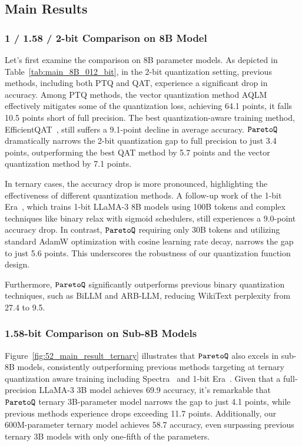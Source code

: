  


\subsection{Main Results}
\subsubsection{1 / 1.58 / 2-bit Comparison on 8B Model}
\label{sec:exp_8b}
Let's first examine the comparison on 8B parameter models. As depicted in Table~\ref{tab:main_8B_012_bit}, in the 2-bit quantization setting, previous methods, including both PTQ and QAT, experience a significant drop in accuracy. Among PTQ methods, the vector quantization method AQLM~\cite{egiazarian2024aqlm} effectively mitigates some of the quantization loss, achieving 64.1 points, it falls 10.5 points short of full precision. The best quantization-aware training method, EfficientQAT~\cite{chen2024efficientqat}, still suffers a 9.1-point decline in average accuracy.  $\texttt{ParetoQ}$ dramatically narrows the 2-bit quantization gap to full precision to just 3.4 points, outperforming the best QAT method by 5.7 points and the vector quantization method by 7.1 points.

In ternary cases, the accuracy drop is more pronounced, highlighting the effectiveness of different quantization methods. A follow-up work of the 1-bit Era~\cite{llama8B_1.58bit}, which trains 1-bit LLaMA-3 8B models using 100B tokens and complex techniques like binary relax with sigmoid schedulers, still experiences a 9.0-point accuracy drop. In contrast, $\texttt{ParetoQ}$ requiring only 30B tokens and utilizing standard AdamW optimization with cosine learning rate decay, narrows the gap to just 5.6 points. This underscores the robustness of our quantization function design. 

Furthermore, $\texttt{ParetoQ}$ significantly outperforms previous binary quantization techniques, such as BiLLM and ARB-LLM, reducing WikiText perplexity from 27.4 to 9.5.

\subsubsection{1.58-bit Comparison on Sub-8B Models}
\label{sec:exp_ternary}
Figure~\ref{fig:52_main_result_ternary} illustrates that $\texttt{ParetoQ}{}$ also excels in sub-8B models, consistently outperforming previous methods targeting at ternary quantization aware training including Spectra~\cite{kaushal2024spectra} and 1-bit Era~\cite{ma2024era}. Given that a full-precision LLaMA-3 3B model achieves 69.9 accuracy, it's remarkable that $\texttt{ParetoQ}{}$ ternary 3B-parameter model narrows the gap to just 4.1 points, while previous methods experience drops exceeding 11.7 points. Additionally, our 600M-parameter ternary model achieves 58.7 accuracy, even surpassing previous ternary 3B models with only one-fifth of the parameters.


